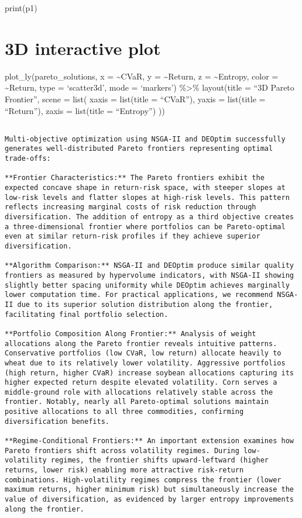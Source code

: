 \documentclass[
  10pt,
  a4paper,
]{article}
\begin{document}
\begin{tcolorbox}
print(p1)

\section{3D interactive plot}\label{d-interactive-plot}

plot\_ly(pareto\_solutions, x = \textasciitilde CVaR, y =
\textasciitilde Return, z = \textasciitilde Entropy, color =
\textasciitilde Return, type = `scatter3d', mode = `markers')
\%\textgreater\% layout(title = ``3D Pareto Frontier'', scene = list(
xaxis = list(title = ``CVaR''), yaxis = list(title = ``Return''), zaxis
= list(title = ``Entropy'') ))

\begin{verbatim}

Multi-objective optimization using NSGA-II and DEOptim successfully generates well-distributed Pareto frontiers representing optimal trade-offs:

**Frontier Characteristics:** The Pareto frontiers exhibit the expected concave shape in return-risk space, with steeper slopes at low-risk levels and flatter slopes at high-risk levels. This pattern reflects increasing marginal costs of risk reduction through diversification. The addition of entropy as a third objective creates a three-dimensional frontier where portfolios can be Pareto-optimal even at similar return-risk profiles if they achieve superior diversification.

**Algorithm Comparison:** NSGA-II and DEOptim produce similar quality frontiers as measured by hypervolume indicators, with NSGA-II showing slightly better spacing uniformity while DEOptim achieves marginally lower computation time. For practical applications, we recommend NSGA-II due to its superior solution distribution along the frontier, facilitating final portfolio selection.

**Portfolio Composition Along Frontier:** Analysis of weight allocations along the Pareto frontier reveals intuitive patterns. Conservative portfolios (low CVaR, low return) allocate heavily to wheat due to its relatively lower volatility. Aggressive portfolios (high return, higher CVaR) increase soybean allocations capturing its higher expected return despite elevated volatility. Corn serves a middle-ground role with allocations relatively stable across the frontier. Notably, nearly all Pareto-optimal solutions maintain positive allocations to all three commodities, confirming diversification benefits.

**Regime-Conditional Frontiers:** An important extension examines how Pareto frontiers shift across volatility regimes. During low-volatility regimes, the frontier shifts upward-leftward (higher returns, lower risk) enabling more attractive risk-return combinations. High-volatility regimes compress the frontier (lower maximum returns, higher minimum risk) but simultaneously increase the value of diversification, as evidenced by larger entropy improvements along the frontier.


\end{verbatim}
\end{tcolorbox}
\end{document}
